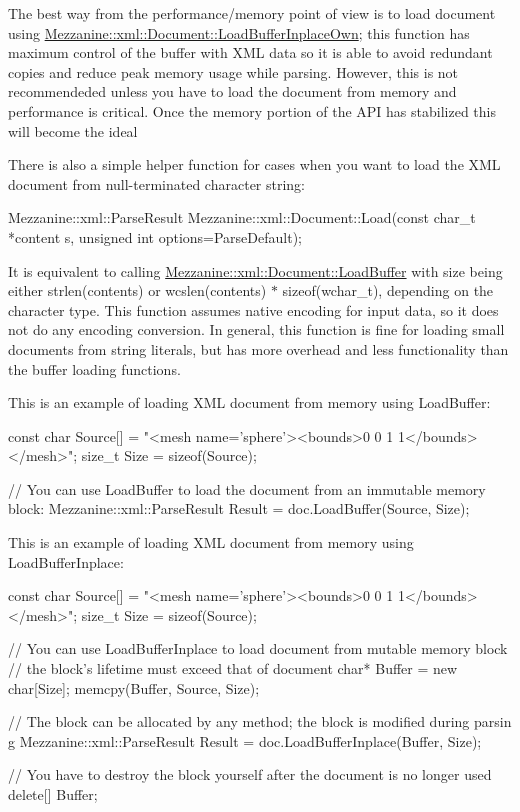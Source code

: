  \par
 The best way from the performance/memory point of view is to load document using \hyperlink{classMezzanine_1_1xml_1_1Document_ae795eaf8f7985d292f81295c210dbf5d}{Mezzanine::xml::Document::LoadBufferInplaceOwn}; this function has maximum control of the buffer with XML data so it is able to avoid redundant copies and reduce peak memory usage while parsing. However, this is not recommendeded unless you have to load the document from memory and performance is critical. Once the memory portion of the API has stabilized this will become the ideal \par
 \par
 There is also a simple helper function for cases when you want to load the XML document from null-\/terminated character string: 
\begin{DoxyCode}
 Mezzanine::xml::ParseResult Mezzanine::xml::Document::Load(const char_t *content
      s, unsigned int options=ParseDefault);
\end{DoxyCode}
 It is equivalent to calling \hyperlink{classMezzanine_1_1xml_1_1Document_a37117f3f1e6f5a834c638421a3d4b7ec}{Mezzanine::xml::Document::LoadBuffer} with size being either strlen(contents) or wcslen(contents) $\ast$ sizeof(wchar\_\-t), depending on the character type. This function assumes native encoding for input data, so it does not do any encoding conversion. In general, this function is fine for loading small documents from string literals, but has more overhead and less functionality than the buffer loading functions. \par
 \par
 This is an example of loading XML document from memory using LoadBuffer: 
\begin{DoxyCode}
 const char Source[] = "<mesh name='sphere'><bounds>0 0 1 1</bounds></mesh>";
 size_t Size = sizeof(Source);

 // You can use LoadBuffer to load the document from an immutable memory block:
 Mezzanine::xml::ParseResult Result = doc.LoadBuffer(Source, Size);
\end{DoxyCode}
 This is an example of loading XML document from memory using LoadBufferInplace: 
\begin{DoxyCode}
 const char Source[] = "<mesh name='sphere'><bounds>0 0 1 1</bounds></mesh>";
 size_t Size = sizeof(Source);

 // You can use LoadBufferInplace to load document from mutable memory block
 // the block's lifetime must exceed that of document
 char* Buffer = new char[Size];
 memcpy(Buffer, Source, Size);

 // The block can be allocated by any method; the block is modified during parsin
      g
 Mezzanine::xml::ParseResult Result = doc.LoadBufferInplace(Buffer, Size);

 // You have to destroy the block yourself after the document is no longer used
 delete[] Buffer;
\end{DoxyCode}
